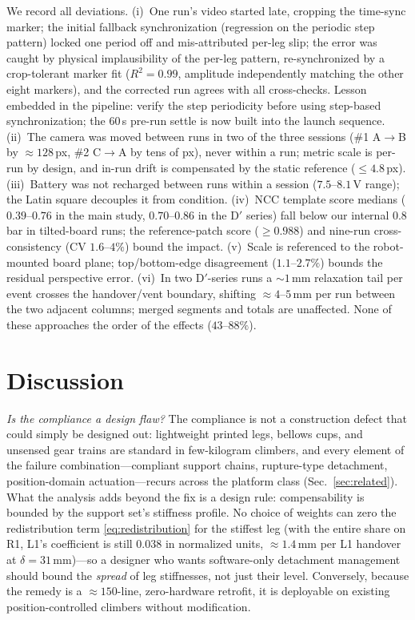 \documentclass[journal]{IEEEtran}
\begin{document}
We record all deviations. (i)~One run's video started late, cropping
the time-sync marker; the initial fallback synchronization (regression on the periodic
step pattern) locked one period off and mis-attributed per-leg slip; the
error was caught by physical implausibility of the per-leg pattern,
re-synchronized by a crop-tolerant marker fit ($R^2=0.99$, amplitude
independently matching the other eight markers), and the corrected run
agrees with all cross-checks. Lesson embedded in the pipeline: verify the step periodicity before
using step-based synchronization; the $60$\,s pre-run settle is
now built into the launch sequence. (ii)~The camera was moved between
runs in two of the three sessions (\#1 A$\to$B by ${\approx}128$\,px,
\#2 C$\to$A by tens of px), never within a run; metric scale is per-run
by design, and in-run drift is compensated by the static reference
(${\le}4.8$\,px). (iii)~Battery was not recharged between runs within a
session ($7.5$--$8.1$\,V range); the Latin square decouples it from
condition. (iv)~NCC template score medians ($0.39$--$0.76$ in the main
study, $0.70$--$0.86$ in the D$'$ series) fall below
our internal $0.8$ bar in tilted-board runs; the reference-patch score
($\ge0.988$) and nine-run cross-consistency (CV $1.6$--$4\%$) bound
the impact. (v)~Scale is referenced to the robot-mounted board plane;
top/bottom-edge disagreement ($1.1$--$2.7\%$) bounds the residual
perspective error. (vi)~In two D$'$-series runs a ${\sim}1$\,mm
relaxation tail per event crosses the handover/vent boundary, shifting
${\approx}4$--$5$\,mm per run between the two adjacent columns; merged
segments and totals are unaffected. None of these approaches the
order of the effects ($43$--$88\%$).

\section{Discussion}
\label{sec:discussion}

\emph{Is the compliance a design flaw?} The compliance is not a
construction defect that could simply be designed out: lightweight
printed legs, bellows cups, and unsensed gear trains are standard in
few-kilogram climbers, and every element of the failure
combination---compliant support chains, rupture-type detachment,
position-domain actuation---recurs across the platform class
(Sec.~\ref{sec:related}). What the analysis adds beyond the fix is a
design rule: compensability is bounded by the support set's stiffness
profile. No choice of weights can zero the redistribution term
\eqref{eq:redistribution} for the stiffest leg (with the entire share
on R1, L1's coefficient is still $0.038$ in normalized units,
${\approx}1.4$\,mm per L1 handover at $\delta=31$\,mm)---so a designer who wants software-only
detachment management should bound the \emph{spread} of leg stiffnesses,
not just their level. Conversely, because the remedy is a
${\approx}150$-line, zero-hardware retrofit, it is deployable on
existing position-controlled climbers without modification.
\end{document}

